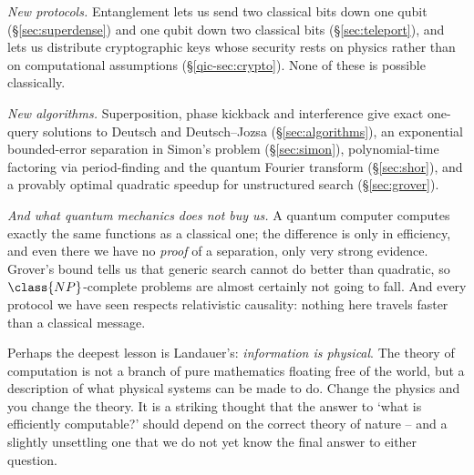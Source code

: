 \emph{New protocols.} Entanglement lets us send two classical bits down one qubit (\S\ref{sec:superdense}) and one qubit down two classical bits (\S\ref{sec:teleport}), and lets us distribute cryptographic keys whose security rests on physics rather than on computational assumptions (\S\ref{qic-sec:crypto}). None of these is possible classically.

\emph{New algorithms.} Superposition, phase kickback and interference give exact one-query solutions to Deutsch and Deutsch--Jozsa (\S\ref{sec:algorithms}), an exponential bounded-error separation in Simon's problem (\S\ref{sec:simon}), polynomial-time factoring via period-finding and the quantum Fourier transform (\S\ref{sec:shor}), and a provably optimal quadratic speedup for unstructured search (\S\ref{sec:grover}).

\emph{And what quantum mechanics does not buy us.} A quantum computer computes exactly the same functions as a classical one; the difference is only in efficiency, and even there we have no \emph{proof} of a separation, only very strong evidence. Grover's bound tells us that generic search cannot do better than quadratic, so $\class{NP}$-complete problems are almost certainly not going to fall. And every protocol we have seen respects relativistic causality: nothing here travels faster than a classical message.

Perhaps the deepest lesson is Landauer's: \emph{information is physical}. The theory of computation is not a branch of pure mathematics floating free of the world, but a description of what physical systems can be made to do. Change the physics and you change the theory. It is a striking thought that the answer to `what is efficiently computable?' should depend on the correct theory of nature -- and a slightly unsettling one that we do not yet know the final answer to either question.
